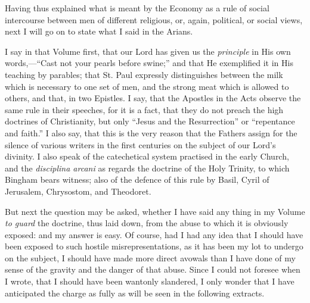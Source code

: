 Having thus explained what is meant by the Economy as a rule of
social intercourse between men of different religious, or, again,
political, or social views, next I will go on to state what I
said in the Arians.

I say in that Volume first, that our Lord has given us the \emph{principle}
in His own words,—``Cast not your pearls before swine;'' and
that He exemplified it in His teaching by parables; that St. Paul
expressly distinguishes between the milk which is necessary to one set
of men, and the strong meat which is allowed to others, and that, in two
Epistles. I say, that the Apostles in the Acts observe the same rule in
their speeches, for it is a fact, that they do not preach the high
doctrines of Christianity, but only ``Jesus and the Resurrection'' or ``repentance and faith.'' I also say, that this
is the very reason that the Fathers assign for the silence of various
writers in the first centuries on the subject of our Lord's divinity. I
also speak of the catechetical system practised in the early Church, and
the \emph{disciplina arcani} as regards the doctrine of the Holy
Trinity, to which Bingham bears witness; also of the defence of this
rule by Basil, Cyril of Jerusalem, Chrysostom, and Theodoret.

But next the question
may be asked, whether I have said any thing in my Volume \emph{to guard}
the doctrine, thus laid down, from the abuse to which it is obviously
exposed: and my answer is easy. Of course, had I had any idea that I
should have been exposed to such hostile misrepresentations, as it has
been my lot to undergo on the subject, I should have made more direct
avowals than I have done of my sense of the gravity and the danger of
that abuse. Since I could not foresee when I wrote, that I should have
been wantonly slandered, I only wonder that I have anticipated the
charge as fully as will be seen in the following extracts.

